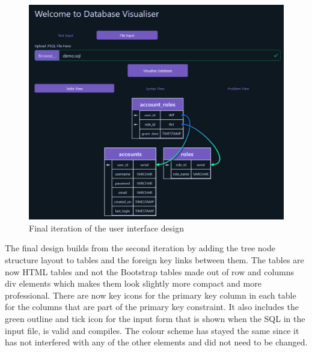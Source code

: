 \begin{figure}[h!]
	\centering
	\includegraphics[width=\textwidth]{finalDesign}
	\caption{Final iteration of the user interface design}
	\label{fig:finalDesign}
\end{figure}

The final design builds from the second iteration by adding the tree node structure layout to tables and the foreign key links between them. The tables are now HTML tables and not the Bootstrap tables made out of row and columns div elements which makes them look slightly more compact and more professional. There are now key icons for the primary key column in each table for the columns that are part of the primary key constraint. It also includes the green outline and tick icon for the input form that is shown when the SQL in the input file, is valid and compiles. The colour scheme has stayed the same since it has not interfered with any of the other elements and did not need to be changed. 